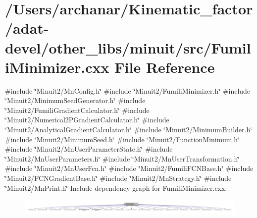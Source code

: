 \hypertarget{adat-devel_2other__libs_2minuit_2src_2FumiliMinimizer_8cxx}{}\section{/\+Users/archanar/\+Kinematic\+\_\+factor/adat-\/devel/other\+\_\+libs/minuit/src/\+Fumili\+Minimizer.cxx File Reference}
\label{adat-devel_2other__libs_2minuit_2src_2FumiliMinimizer_8cxx}
{\ttfamily \#include \char`\"{}Minuit2/\+Mn\+Config.\+h\char`\"{}}\newline
{\ttfamily \#include \char`\"{}Minuit2/\+Fumili\+Minimizer.\+h\char`\"{}}\newline
{\ttfamily \#include \char`\"{}Minuit2/\+Minimum\+Seed\+Generator.\+h\char`\"{}}\newline
{\ttfamily \#include \char`\"{}Minuit2/\+Fumili\+Gradient\+Calculator.\+h\char`\"{}}\newline
{\ttfamily \#include \char`\"{}Minuit2/\+Numerical2\+P\+Gradient\+Calculator.\+h\char`\"{}}\newline
{\ttfamily \#include \char`\"{}Minuit2/\+Analytical\+Gradient\+Calculator.\+h\char`\"{}}\newline
{\ttfamily \#include \char`\"{}Minuit2/\+Minimum\+Builder.\+h\char`\"{}}\newline
{\ttfamily \#include \char`\"{}Minuit2/\+Minimum\+Seed.\+h\char`\"{}}\newline
{\ttfamily \#include \char`\"{}Minuit2/\+Function\+Minimum.\+h\char`\"{}}\newline
{\ttfamily \#include \char`\"{}Minuit2/\+Mn\+User\+Parameter\+State.\+h\char`\"{}}\newline
{\ttfamily \#include \char`\"{}Minuit2/\+Mn\+User\+Parameters.\+h\char`\"{}}\newline
{\ttfamily \#include \char`\"{}Minuit2/\+Mn\+User\+Transformation.\+h\char`\"{}}\newline
{\ttfamily \#include \char`\"{}Minuit2/\+Mn\+User\+Fcn.\+h\char`\"{}}\newline
{\ttfamily \#include \char`\"{}Minuit2/\+Fumili\+F\+C\+N\+Base.\+h\char`\"{}}\newline
{\ttfamily \#include \char`\"{}Minuit2/\+F\+C\+N\+Gradient\+Base.\+h\char`\"{}}\newline
{\ttfamily \#include \char`\"{}Minuit2/\+Mn\+Strategy.\+h\char`\"{}}\newline
{\ttfamily \#include \char`\"{}Minuit2/\+Mn\+Print.\+h\char`\"{}}\newline
Include dependency graph for Fumili\+Minimizer.\+cxx\+:
\nopagebreak
\begin{figure}[H]
\begin{center}
\leavevmode
\includegraphics[width=350pt]{d0/d6a/adat-devel_2other__libs_2minuit_2src_2FumiliMinimizer_8cxx__incl}
\end{center}
\end{figure}
